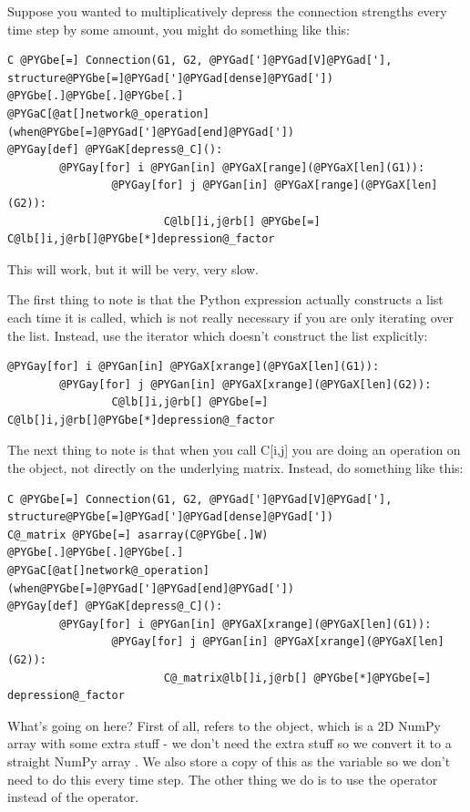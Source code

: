 \documentclass[letterpaper,10pt,english]{manual}
\begin{document}
Suppose you wanted to multiplicatively depress the connection
strengths every time step by some amount, you might do something like
this:

\begin{Verbatim}[commandchars=@\[\]]
C @PYGbe[=] Connection(G1, G2, @PYGad[']@PYGad[V]@PYGad['], structure@PYGbe[=]@PYGad[']@PYGad[dense]@PYGad['])
@PYGbe[.]@PYGbe[.]@PYGbe[.]
@PYGaC[@at[]network@_operation](when@PYGbe[=]@PYGad[']@PYGad[end]@PYGad['])
@PYGay[def] @PYGaK[depress@_C]():
        @PYGay[for] i @PYGan[in] @PYGaX[range](@PYGaX[len](G1)):
                @PYGay[for] j @PYGan[in] @PYGaX[range](@PYGaX[len](G2)):
                        C@lb[]i,j@rb[] @PYGbe[=] C@lb[]i,j@rb[]@PYGbe[*]depression@_factor
\end{Verbatim}

This will work, but it will be very, very slow.

The first thing to note is that the Python expression 
actually constructs a list \code{{[}0,1,2,...,N-1{]}} each time it is called,
which is not really necessary if you are only iterating over the list.
Instead, use the  iterator which doesn't construct the list
explicitly:

\begin{Verbatim}[commandchars=@\[\]]
@PYGay[for] i @PYGan[in] @PYGaX[xrange](@PYGaX[len](G1)):
        @PYGay[for] j @PYGan[in] @PYGaX[xrange](@PYGaX[len](G2)):
                C@lb[]i,j@rb[] @PYGbe[=] C@lb[]i,j@rb[]@PYGbe[*]depression@_factor
\end{Verbatim}

The next thing to note is that when you call C{[}i,j{]} you are doing an
operation on the \hyperlink{brian.Connection}{} object, not directly on the underlying
matrix. Instead, do something like this:

\begin{Verbatim}[commandchars=@\[\]]
C @PYGbe[=] Connection(G1, G2, @PYGad[']@PYGad[V]@PYGad['], structure@PYGbe[=]@PYGad[']@PYGad[dense]@PYGad['])
C@_matrix @PYGbe[=] asarray(C@PYGbe[.]W)
@PYGbe[.]@PYGbe[.]@PYGbe[.]
@PYGaC[@at[]network@_operation](when@PYGbe[=]@PYGad[']@PYGad[end]@PYGad['])
@PYGay[def] @PYGaK[depress@_C]():
        @PYGay[for] i @PYGan[in] @PYGaX[xrange](@PYGaX[len](G1)):
                @PYGay[for] j @PYGan[in] @PYGaX[xrange](@PYGaX[len](G2)):
                        C@_matrix@lb[]i,j@rb[] @PYGbe[*]@PYGbe[=] depression@_factor
\end{Verbatim}

What's going on here? First of all,  refers to the \hyperlink{brian.ConnectionMatrix}{}
object, which is a 2D NumPy array with some extra stuff - we don't need the extra
stuff so we convert it to a straight NumPy array . We also store
a copy of this as the variable  so we don't need to do this every
time step. The other thing we do is to use the \code{*=} operator instead of the \code{*}
operator.
\end{document}
